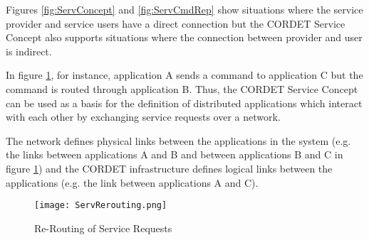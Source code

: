 Figures \ref{fig:ServConcept} and \ref{fig:ServCmdRep} show situations where the service provider and service users have a direct connection but the CORDET Service Concept also supports situations where the connection between provider and user is indirect.

In figure \ref{fig:ServRerouting}, for instance, application A sends a command to application C but the command is routed through application B. 
Thus, the CORDET Service Concept can be used as a basis for the definition of distributed applications which interact with each other by exchanging service requests over a network. 

The network defines physical links between the applications in the system (e.g. the links between applications A and B and between applications B and C in figure \ref{fig:ServRerouting}) and the CORDET infrastructure defines logical links between the applications (e.g. the link between applications A and C).

\begin{figure}[ht]
 \centering
 \texttt{[image: ServRerouting.png]}
 \caption{Re-Routing of Service Requests}
 \label{fig:ServRerouting}
\end{figure}

